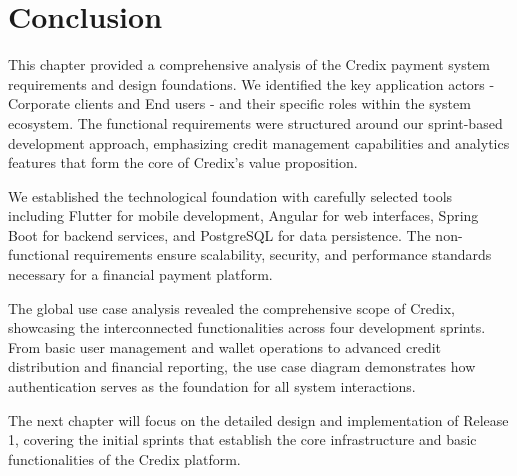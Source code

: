 \section*{Conclusion}

This chapter provided a comprehensive analysis of the Credix payment system requirements and design foundations. We identified the key application actors - Corporate clients and End users - and their specific roles within the system ecosystem. The functional requirements were structured around our sprint-based development approach, emphasizing credit management capabilities and analytics features that form the core of Credix's value proposition.

We established the technological foundation with carefully selected tools including Flutter for mobile development, Angular for web interfaces, Spring Boot for backend services, and PostgreSQL for data persistence. The non-functional requirements ensure scalability, security, and performance standards necessary for a financial payment platform.

The global use case analysis revealed the comprehensive scope of Credix, showcasing the interconnected functionalities across four development sprints. From basic user management and wallet operations to advanced credit distribution and financial reporting, the use case diagram demonstrates how authentication serves as the foundation for all system interactions.

The next chapter will focus on the detailed design and implementation of Release 1, covering the initial sprints that establish the core infrastructure and basic functionalities of the Credix platform.

